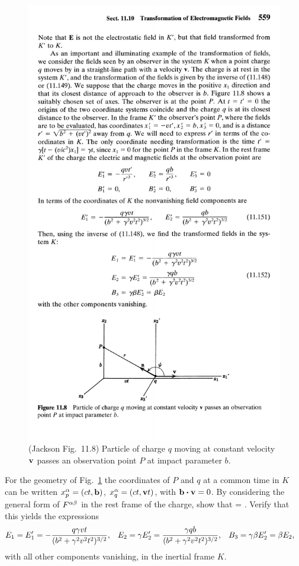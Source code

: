 \begin{figure} \centering
\includegraphics{11-8}
\caption{(Jackson Fig.~11.8) Particle of charge $q$ moving at constant velocity $\vb{v}$ passes an observation point $P$ at impact parameter $b$.}
\label{11.8}
\end{figure}

\begin{problem} \label{2.a}
	For the geometry of Fig.~\ref{11.8} the coordinates of $P$ and $q$ at a common time in $K$ can be written $x^\alpha_p = (ct, \vb{b})$, $x^\alpha_q = (ct, \vb{v} t)$, with $\vbb \vdot \vv = 0$.  By considering the general form of $F^{\alpha \beta}$ in the rest frame of the charge, show that
	\beqn \label{show2.a}
		\Fab =  .
	\eeqn
	Verify that this yields the expressions
	\begin{align} \label{fields}
		E_1 &= E_1' = -\frac{q \gamma v t}{(b^2 + \gamma^2 v^2 t^2)^{3/2}}, &
		E_2 &= \gamma E_2' = \frac{\gamma q b}{(b^2 + \gamma^2 v^2 t^2)^{3/2}}, &
		B_3 &= \gamma \beta E_2' = \beta E_2,
	\end{align}
	with all other components vanishing, in the inertial frame $K$.
\end{problem}



